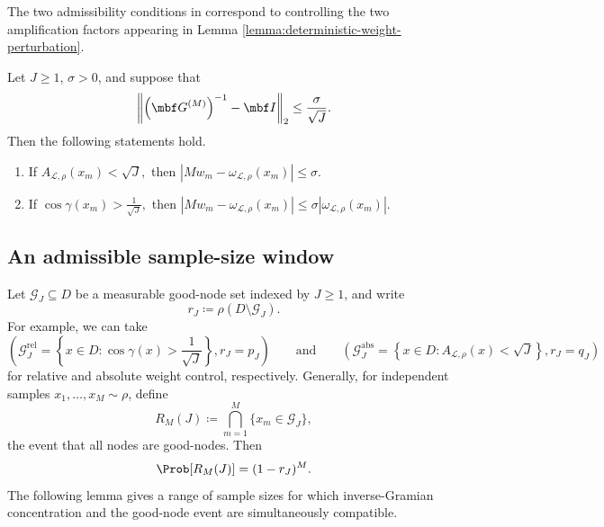 \documentclass[10pt,dvipsnames]{amsart}
\begin{document}
The two admissibility conditions in  correspond to controlling the two
amplification factors appearing in
Lemma \ref{lemma:deterministic-weight-perturbation}.

\begin{corollary}
\label{cor:deterministic-good-node-bounds}
Let \(J\geq1\), \(\sigma>0\), and suppose that
\[
    \left\|
        \left(\mbf G^{(M)}\right)^{-1}-\mbf I
    \right\|_2
    \leq
    \frac{\sigma}{\sqrt J}.
\]
Then the following statements hold.
\begin{enumerate}
    \item If
    \(
        A_{\mathcal L,\rho}(x_m)<\sqrt J,
    \)
    then
    \(
        \left|
            M w_m-\omega_{\mathcal L,\rho}(x_m)
        \right|
        \leq \sigma.
    \)

    \item If
    \(
        \cos\gamma(x_m)>\frac{1}{\sqrt J},
    \)
    then
    \(
        \left|
            M w_m-\omega_{\mathcal L,\rho}(x_m)
        \right|
        \leq
        \sigma
        \left|
            \omega_{\mathcal L,\rho}(x_m)
        \right|.
    \)
\end{enumerate}
\end{corollary}

\subsection{An admissible sample-size window}
\label{subsec:sample-size-window}

Let \(\mathcal G_J\subseteq D\) be a measurable good-node set indexed by
\(J\geq1\), and write
\[
    r_J
    \coloneqq
    \rho(D\setminus\mathcal G_J).
\]
For example, we can take 
\[
   \left(\mathcal G_J^{\mathrm{rel}}
    =
    \left\{
        x\in D:
        \cos\gamma(x)>\frac1{\sqrt J}
    \right\},
    r_J=p_J\right)
    \qquad 
    \text{and}
    \qquad
    \left(\mathcal G_J^{\mathrm{abs}}
    =
    \left\{
        x\in D:
        A_{\mathcal L,\rho}(x)<\sqrt J
    \right\},
    r_J=q_J\right)
\]
for relative and absolute weight control, respectively.
Generally, for independent samples \(x_1,\ldots,x_M\sim\rho\), define
\[
    R_M(J)
    \coloneqq
    \bigcap_{m=1}^M\{x_m\in\mathcal G_J\},
\]
the event that all nodes are good-nodes. 
Then
\[
    \Prob[R_M(J)]
    =
    (1-r_J)^M.
\]
The following lemma gives a range of sample sizes for which inverse-Gramian
concentration and the good-node event are simultaneously compatible.
\end{document}
